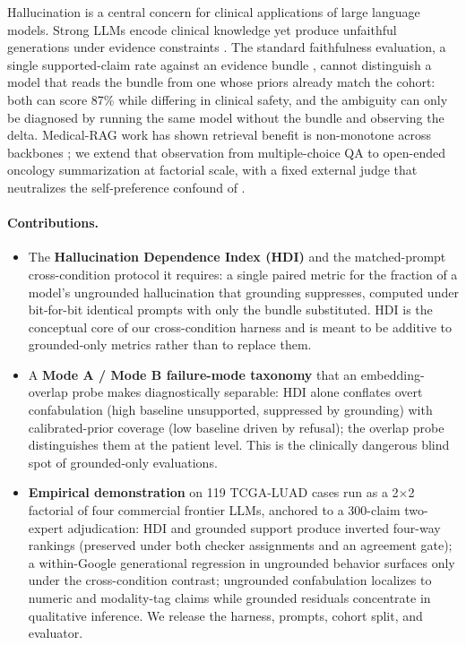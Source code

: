 \documentclass{article}
\theoremstyle{plain}
\begin{document}
Hallucination is a central concern for clinical applications of large language models. Strong LLMs encode clinical knowledge \citep{singhal2023largelanguagemodelsencode} yet produce unfaithful generations under evidence constraints \citep{ji2023survey,maynez2020faithfulness,pal2023medhalt}. The standard faithfulness evaluation, a single supported-claim rate against an evidence bundle \citep{deyoung2021ms2,tsatsaronis2015bioasq}, cannot distinguish a model that reads the bundle from one whose priors already match the cohort: both can score 87\% while differing in clinical safety, and the ambiguity can only be diagnosed by running the same model without the bundle and observing the delta. Medical-RAG work has shown retrieval benefit is non-monotone across backbones \citep{xiong2024benchmarking}; we extend that observation from multiple-choice QA to open-ended oncology summarization at factorial scale, with a fixed external judge that neutralizes the self-preference confound of \citet{panickssery2024llm,zheng2023judging}.

\paragraph{Contributions.}
\begin{itemize}
\item The \textbf{Hallucination Dependence Index (HDI)} and the matched-prompt cross-condition protocol it requires: a single paired metric for the fraction of a model's ungrounded hallucination that grounding suppresses, computed under bit-for-bit identical prompts with only the bundle substituted. HDI is the conceptual core of our cross-condition harness and is meant to be additive to grounded-only metrics rather than to replace them.
\item A \textbf{Mode A / Mode B failure-mode taxonomy} that an embedding-overlap probe makes diagnostically separable: HDI alone conflates overt confabulation (high baseline unsupported, suppressed by grounding) with calibrated-prior coverage (low baseline driven by refusal); the overlap probe distinguishes them at the patient level. This is the clinically dangerous blind spot of grounded-only evaluations.
\item \textbf{Empirical demonstration} on 119 TCGA-LUAD cases run as a 2$\times$2 factorial of four commercial frontier LLMs, anchored to a 300-claim two-expert adjudication: HDI and grounded support produce inverted four-way rankings (preserved under both checker assignments and an agreement gate); a within-Google generational regression in ungrounded behavior surfaces only under the cross-condition contrast; ungrounded confabulation localizes to numeric and modality-tag claims while grounded residuals concentrate in qualitative inference. We release the harness, prompts, cohort split, and evaluator.
\end{itemize}
\end{document}
